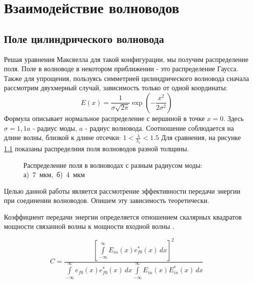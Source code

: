 \chapter{Взаимодействие волноводов}
\section{Поле цилиндрического волновода}
Решая уравнения Максвелла для такой конфигурации, мы получим распределение поля.
Поле в волноводе в некотором приближении - это распределение Гаусса. Также для упрощения, пользуясь симметрией цилиндрического волновода сначала рассмотрим двухмерный случай, зависимость только от одной координаты:
\begin{equation}
  \label{gauss}
  E(x)=\frac{1}{\sigma\sqrt{2\pi}}\exp\left(-\frac{x^2}{2\sigma^2}\right)
\end{equation}
Формула описывает нормальное распределение с вершиной в точке $x=0$.
Здесь $\sigma = 1,1a$ - радиус моды, $a$ - радиус волновода. Соотношение соблюдается на длине волны, близкой к длине отсечки: $1 < \frac{\lambda}{\lambda_c} < 1.5$
Для сравнения, на рисунке \ref{diameter} показаны распределния поля волноводов разной толщины.

\begin{figure}[h!]
	\begin{minipage}[h]{0.49\linewidth}
	\end{minipage}
	\hfill
	\begin{minipage}[h]{0.49\linewidth}
	\end{minipage}
	\caption{Распределение поля в волноводах с разным радиусом моды: \mbox{а) 7~мкм, б) 4~мкм}}
	\label{diameter}
\end{figure}

Целью данной работы является рассмотрение эффективности передачи энергии при соединении волноводов. Опишем эту зависимость теоретически.

Коэффициент передачи энергии определяется отношением скалярных квадратов мощности связанной волны к мощности входной волны \cite{lefevre}.

\begin{equation}
	\label{coupling_full}
	C = \frac{\left[\int\limits_{-\infty}^{\infty}E_{in}(x)e_{f0}^*(x) \,dx\right]^2}
	{\int\limits_{-\infty}^{\infty}e_{f0}(x)e_{f0}^*(x) \,dx
	 \int\limits_{-\infty}^{\infty}E_{in}(x)E_{in}^*(x) \,dx}
\end{equation}

